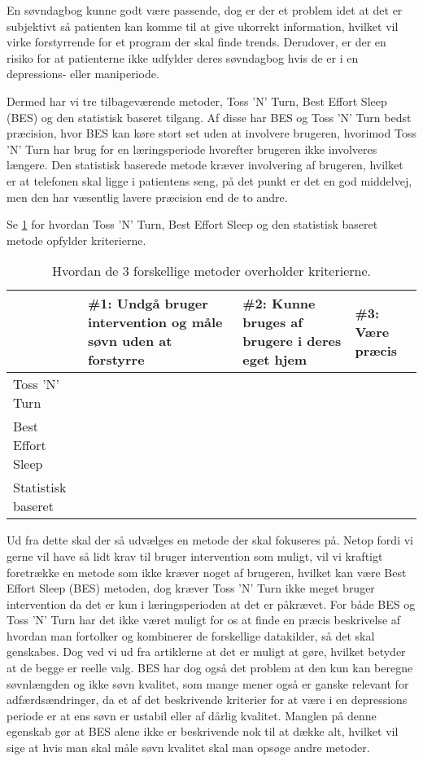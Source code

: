 En søvndagbog kunne godt være passende, dog er der et problem idet at det er subjektivt så patienten kan komme til at give ukorrekt information, hvilket vil virke forstyrrende for et program der skal finde trends.
Derudover, er der en risiko for at patienterne ikke udfylder deres søvndagbog hvis de er i en depressions- eller maniperiode.

Dermed har vi tre tilbageværende metoder, Toss 'N' Turn, Best Effort Sleep (BES) og den statistisk baseret tilgang.
Af disse har BES og Toss 'N' Turn bedst præcision, hvor BES kan køre stort set uden at involvere brugeren, hvorimod Toss 'N' Turn har brug for en læringsperiode hvorefter brugeren ikke involveres længere.
Den statistisk baserede metode kræver involvering af brugeren, hvilket er at telefonen skal ligge i patientens seng, på det punkt er det en god middelvej, men den har væsentlig lavere præcision end de to andre.

Se \cref{tab:soevnMetodeKriterier} for hvordan Toss 'N' Turn, Best Effort Sleep og den statistisk baseret metode opfylder kriterierne.

\begin{table}
\begin{tabular}{|p{4cm}|p{3cm}|p{3cm}|p{3cm}|}
	\hline  ~ & \#1: Undgå bruger intervention og måle søvn uden at forstyrre & \#2: Kunne bruges af brugere i deres eget hjem & \#3: Være præcis \\ 
	\hline Toss 'N' Turn &  & \checkmark & \checkmark \\ 
	\hline Best Effort Sleep & \checkmark & \checkmark & \checkmark \\ 
	\hline Statistisk baseret &  & \checkmark &  \\ 
	\hline 
\end{tabular}
\caption{Hvordan de 3 forskellige metoder overholder kriterierne.}
\label{tab:soevnMetodeKriterier}
\end{table}

Ud fra dette skal der så udvælges en metode der skal fokuseres på. 
Netop fordi vi gerne vil have så lidt krav til bruger intervention som muligt, vil vi kraftigt foretrække en metode som ikke kræver noget af brugeren, hvilket kan være Best Effort Sleep (BES) metoden, dog kræver Toss 'N' Turn ikke meget bruger intervention da det er kun i læringsperioden at det er påkrævet.
For både BES og Toss 'N' Turn har det ikke været muligt for os at finde en præcis beskrivelse af hvordan man fortolker og kombinerer de forskellige datakilder, så det skal genskabes.
Dog ved vi ud fra artiklerne at det er muligt at gøre, hvilket betyder at de begge er reelle valg. 
BES har dog også det problem at den kun kan beregne søvnlængden og ikke søvn kvalitet, som mange mener også er ganske relevant for adfærdsændringer, da et af det beskrivende kriterier for at være i en depressions periode er at ens søvn er ustabil eller af dårlig kvalitet. 
Manglen på denne egenskab gør at BES alene ikke er beskrivende nok til at dække alt, hvilket vil sige at hvis man skal måle søvn kvalitet skal man opsøge andre metoder.

